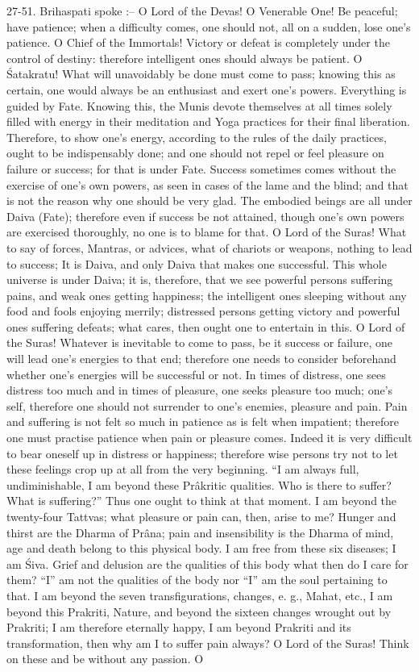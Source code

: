 27-51. Brihaspati spoke :-- O Lord of the Devas! O Venerable One! Be peaceful; have patience; when a difficulty comes, one should not, all on a sudden, lose one's patience. O Chief of the Immortals! Victory or defeat is completely under the control of destiny: therefore intelligent ones should always be patient. O \'Satakratu! What will unavoidably be done must come to pass; knowing this as certain, one would always be an enthusiast and exert one's powers. Everything is guided by Fate. Knowing this, the Munis devote themselves at all times solely filled with energy in their meditation and Yoga practices for their final liberation. Therefore, to show one's energy, according to the rules of the daily practices, ought to be indispensably done; and one should not repel or feel pleasure on failure or success; for that is under Fate. Success sometimes comes without the exercise of one's own powers, as seen in cases of the lame and the blind; and that is not the reason why one should be very glad. The embodied beings are all under Daiva (Fate); therefore even if success be not attained, though one's own powers are exercised thoroughly, no one is to blame for that. O Lord of the Suras! What to say of forces, Mantras, or advices, what of chariots or weapons, nothing to lead to success; It is Daiva, and only Daiva that makes one successful. This whole universe is under Daiva; it is, therefore, that we see powerful persons suffering pains, and weak ones getting happiness; the intelligent ones sleeping without any food and fools enjoying merrily; distressed persons getting victory and powerful ones suffering defeats; what cares, then ought one to entertain in this. O Lord of the Suras! Whatever is inevitable to come to pass, be it success or failure, one will lead one's energies to that end; therefore one needs to consider beforehand whether one's energies will be successful or not. In times of distress, one sees distress too much and in times of pleasure, one seeks pleasure too much; one's self, therefore one should not surrender to one's enemies, pleasure and pain. Pain and suffering is not felt so much in patience as is felt when impatient; therefore one must practise patience when pain or pleasure comes. Indeed it is very difficult to bear oneself up in distress or happiness; therefore wise persons try not to let these feelings crop up at all from the very beginning. ``I am always full, undiminishable, I am beyond these Pr\^akritic qualities. Who is there to suffer? What is suffering?'' Thus one ought to think at that moment. I am beyond the twenty-four Tattvas; what pleasure or pain can, then, arise to me? Hunger and thirst are the Dharma of Pr\^ana; pain and insensibility is the Dharma of mind, age and death belong to this physical body. I am free from these six diseases; I am \'Siva. Grief and delusion are the qualities of this body what then do I care for them? ``I'' am not the qualities of the body nor ``I'' am the soul pertaining to that. I am beyond the seven transfigurations, changes, e. g., Mahat, etc., I am beyond this Prakriti, Nature, and beyond the sixteen changes wrought out by Prakriti; I am therefore eternally happy, I am beyond Prakriti and its transformation, then why am I to suffer pain always? O Lord of the Suras! Think on these and be without any passion. O 